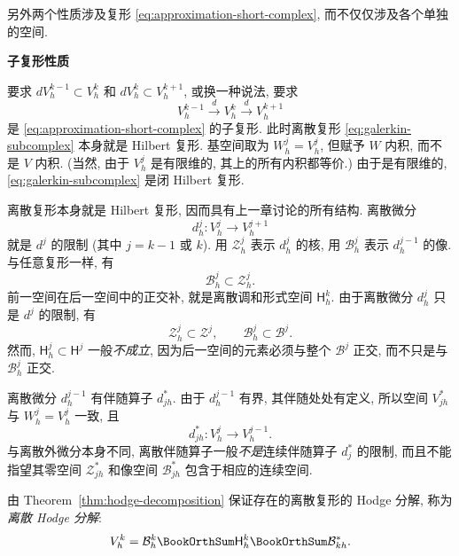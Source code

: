 {另外两个性质涉及复形 \eqref{eq:approximation-short-complex}, 而不仅仅涉及各个单独的空间.}

\medskip\noindent\textbf{{子复形性质}}\par
{要求 $dV_h^{k-1}\subset V_h^k$ 和 $dV_h^k\subset V_h^{k+1}$, 或换一种说法, 要求}
\begin{equation}\label{eq:galerkin-subcomplex}
V_h^{k-1}\xrightarrow{d}V_h^k\xrightarrow{d}V_h^{k+1}
\end{equation}
{是 \eqref{eq:approximation-short-complex} 的子复形. 此时离散复形 \eqref{eq:galerkin-subcomplex} 本身就是 Hilbert 复形. 基空间取为 $W_h^j=V_h^j$, 但赋予 $W$ 内积, 而不是 $V$ 内积. (当然, 由于 $V_h^j$ 是有限维的, 其上的所有内积都等价.) 由于是有限维的, \eqref{eq:galerkin-subcomplex} 是闭 Hilbert 复形.}

{离散复形本身就是 Hilbert 复形, 因而具有上一章讨论的所有结构. 离散微分}
\[
d_h^j:V_h^j\to V_h^{j+1}
\]
{就是 $d^j$ 的限制 (其中 $j=k-1$ 或 $k$). 用 $\mathcal Z_h^j$ 表示 $d_h^j$ 的核, 用 $\mathcal B_h^j$ 表示 $d_h^{j-1}$ 的像. 与任意复形一样, 有}
\[
\mathcal B_h^j\subset\mathcal Z_h^j.
\]
{前一空间在后一空间中的正交补, 就是离散调和形式空间 $\mathsf H_h^k$. 由于离散微分 $d_h^j$ 只是 $d^j$ 的限制, 有}
\[
\mathcal Z_h^j\subset\mathcal Z^j,\qquad\mathcal B_h^j\subset\mathcal B^j.
\]
{然而, $\mathsf H_h^j\subset\mathsf H^j$ 一般\emph{不成立}, 因为后一空间的元素必须与整个 $\mathcal B^j$ 正交, 而不只是与 $\mathcal B_h^j$ 正交.}

{离散微分 $d_h^{j-1}$ 有伴随算子 $d_{jh}^*$. 由于 $d_h^{j-1}$ 有界, 其伴随处处有定义, 所以空间 $V_{jh}^*$ 与 $W_h^j=V_h^j$ 一致, 且}
\[
d_{jh}^*:V_h^j\to V_h^{j-1}.
\]
{与离散外微分本身不同, 离散伴随算子一般\emph{不是}连续伴随算子 $d_j^*$ 的限制, 而且不能指望其零空间 $\mathcal Z_{jh}^*$ 和像空间 $\mathcal B_{jh}^*$ 包含于相应的连续空间.}

{由 Theorem~\ref{thm:hodge-decomposition} 保证存在的离散复形的 Hodge 分解, 称为\emph{离散 Hodge 分解}:}
\begin{equation}\label{eq:discrete-hodge-decomposition}
V_h^k=\mathcal B_h^k\BookOrthSum\mathsf H_h^k\BookOrthSum\mathcal B_{kh}^*.
\end{equation}


